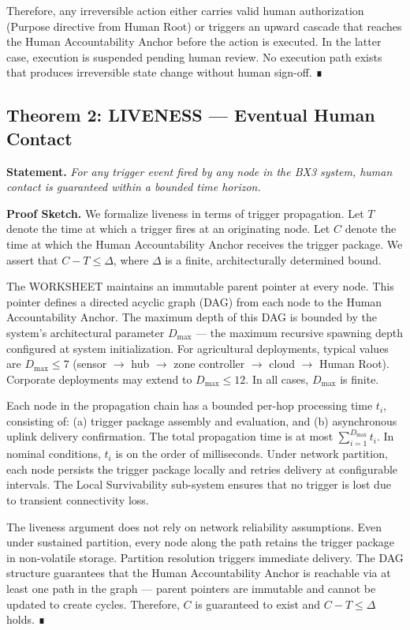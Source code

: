 Therefore, any irreversible action either carries valid human authorization (Purpose directive from Human Root) or triggers an upward cascade that reaches the Human Accountability Anchor before the action is executed. In the latter case, execution is suspended pending human review. No execution path exists that produces irreversible state change without human sign-off. ∎

\subsection{Theorem 2: LIVENESS --- Eventual Human Contact}
\textbf{Statement.} \emph{For any trigger event fired by any node in the BX3 system, human contact is guaranteed within a bounded time horizon.}

\textbf{Proof Sketch.}
We formalize liveness in terms of trigger propagation. Let $T$ denote the time at which a trigger fires at an originating node. Let $C$ denote the time at which the Human Accountability Anchor receives the trigger package. We assert that $C - T \leq \Delta$, where $\Delta$ is a finite, architecturally determined bound.

The WORKSHEET maintains an immutable parent pointer at every node. This pointer defines a directed acyclic graph (DAG) from each node to the Human Accountability Anchor. The maximum depth of this DAG is bounded by the system's architectural parameter $D_{\max}$ --- the maximum recursive spawning depth configured at system initialization. For agricultural deployments, typical values are $D_{\max} \leq 7$ (sensor $\rightarrow$ hub $\rightarrow$ zone controller $\rightarrow$ cloud $\rightarrow$ Human Root). Corporate deployments may extend to $D_{\max} \leq 12$. In all cases, $D_{\max}$ is finite.

Each node in the propagation chain has a bounded per-hop processing time $t_i$, consisting of: (a) trigger package assembly and evaluation, and (b) asynchronous uplink delivery confirmation. The total propagation time is at most $\sum_{i=1}^{D_{\max}} t_i$. In nominal conditions, $t_i$ is on the order of milliseconds. Under network partition, each node persists the trigger package locally and retries delivery at configurable intervals. The Local Survivability sub-system ensures that no trigger is lost due to transient connectivity loss.

The liveness argument does not rely on network reliability assumptions. Even under sustained partition, every node along the path retains the trigger package in non-volatile storage. Partition resolution triggers immediate delivery. The DAG structure guarantees that the Human Accountability Anchor is reachable via at least one path in the graph --- parent pointers are immutable and cannot be updated to create cycles. Therefore, $C$ is guaranteed to exist and $C - T \leq \Delta$ holds. ∎

